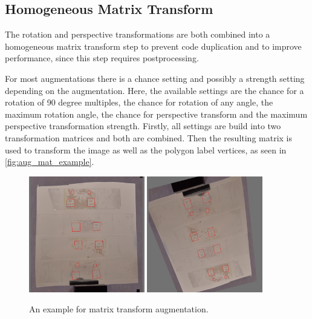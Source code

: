 \documentclass[10pt]{book}
\newcommand{\figureref}[1]{\autoref{#1}}
\begin{document}
\subsection{Homogeneous Matrix Transform}

The rotation and perspective transformations are both combined into a homogeneous matrix transform step to prevent code duplication and to improve performance, since this step requires postprocessing.

For most augmentations there is a chance setting and possibly a strength setting depending on the augmentation. Here, the available settings are the chance for a rotation of 90 degree multiples, the chance for rotation of any angle, the maximum rotation angle, the chance for perspective transform and the maximum perspective transformation strength. Firstly, all settings are build into two transformation matrices and both are combined. Then the resulting matrix is used to transform the image as well as the polygon label vertices, as seen in \figureref{fig:aug_mat_example}.

\begin{figure}
  \centering
     {\includegraphics[width=0.45\textwidth]{image/aug_mat_before}}
     {\includegraphics[width=0.45\textwidth]{image/aug_mat_after}}
  \caption{An example for matrix transform augmentation.}
  \label{fig:aug_mat_example}
\end{figure}
\end{document}
